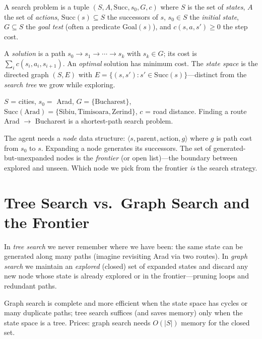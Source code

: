 \begin{definition}
A search problem is a tuple $(S,A,\text{Succ},s_0,G,c)$ where $S$ is the set of \emph{states}, $A$ the set of \emph{actions}, $\text{Succ}(s)\subseteq S$ the successors of $s$, $s_0\in S$ the \emph{initial state}, $G\subseteq S$ the \emph{goal test} (often a predicate $\text{Goal}(s)$), and $c(s,a,s')\ge 0$ the step cost.
\end{definition}
A \emph{solution} is a path $s_0\to s_1\to\cdots\to s_k$ with $s_k\in G$; its cost is $\sum_{i}c(s_i,a_i,s_{i+1})$. An \emph{optimal} solution has minimum cost. The \emph{state space} is the directed graph $(S,E)$ with $E=\{(s,s'):s'\in\text{Succ}(s)\}$---distinct from the \emph{search tree} we grow while exploring.

\begin{example}
$S$ = cities, $s_0=$ Arad, $G=\{\text{Bucharest}\}$, $\text{Succ}(\text{Arad})=\{\text{Sibiu},\text{Timisoara},\text{Zerind}\}$, $c$ = road distance. Finding a route Arad $\to$ Bucharest is a shortest-path search problem.
\end{example}

The agent needs a \emph{node} data structure: $\langle s,\text{parent},\text{action},g\rangle$ where $g$ is path cost from $s_0$ to $s$. Expanding a node generates its successors. The set of generated-but-unexpanded nodes is the \emph{frontier} (or open list)---the boundary between explored and unseen. Which node we pick from the frontier \emph{is} the search strategy.

\section{Tree Search vs.\ Graph Search and the Frontier}
\label{sec:tree-graph-frontier}
In \emph{tree search} we never remember where we have been: the same state can be generated along many paths (imagine revisiting Arad via two routes). In \emph{graph search} we maintain an \emph{explored} (closed) set of expanded states and discard any new node whose state is already explored or in the frontier---pruning loops and redundant paths.

Graph search is complete and more efficient when the state space has cycles or many duplicate paths; tree search suffices (and saves memory) only when the state space is a tree. Prices: graph search needs $O(|S|)$ memory for the closed set.

